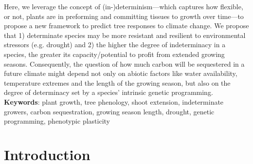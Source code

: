 \documentclass{article}
\begin{document}
		Here, we leverage the concept of (in-)determinism---which captures how flexible, or not, plants are in preforming and committing tissues to growth over time---to propose a new framework to predict tree responses to climate change. We propose that 1) determinate species may be more resistant and resilient to environmental stressors (e.g. drought) and 2) the higher the degree of indeterminacy in a species, the greater its capacity/potential to profit from extended growing seasons. Consequently, the question of how much carbon will be sequestered in a future climate might depend not only on abiotic factors like water availability, temperature extremes and the length of the growing season, but also on the degree of determinacy set by a species' intrinsic genetic programming.\\
		
			\textbf{Keywords}: plant growth, tree phenology, shoot extension, indeterminate growers, carbon sequestration, growing season length, drought, genetic programming, phenotypic plasticity
			\newpage
			
\section*{Introduction}
	
\end{document}
